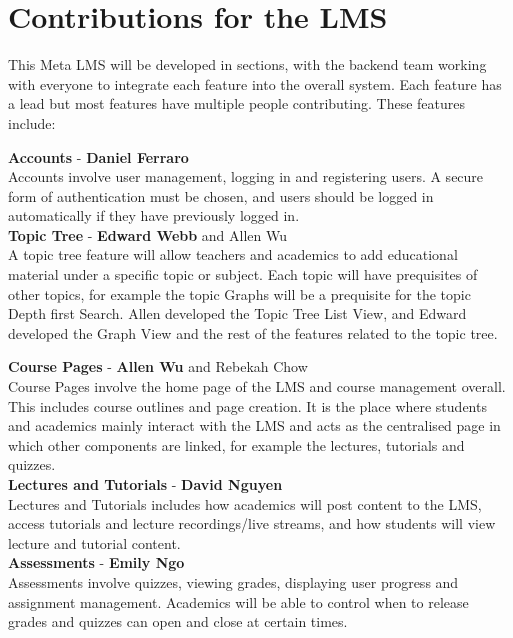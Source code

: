 \section{Contributions for the LMS}
This Meta LMS will be developed in sections, with the backend team working with everyone to integrate each feature into the overall system. Each feature has a lead but most features have multiple people contributing. These features include:

\textbf{Accounts} - \textbf{Daniel Ferraro} \\
Accounts involve user management, logging in and registering users. A secure form of authentication must be chosen, and users should be logged in automatically if they have previously logged in. \\

\textbf{Topic Tree} - \textbf{Edward Webb} and Allen Wu \\
A topic tree feature will allow teachers and academics to add educational material under a specific topic or subject. Each topic will have prequisites of other topics, for example the topic Graphs will be a prequisite for the topic Depth first Search. Allen developed the Topic Tree List View, and Edward developed the Graph View and the rest of the features related to the topic tree.

\textbf{Course Pages} - \textbf{Allen Wu} and Rebekah Chow \\
Course Pages involve the home page of the LMS and course management overall. This includes course outlines and page creation. It is the place where students and academics mainly interact with the LMS and acts as the centralised page in which other components are linked, for example the lectures, tutorials and quizzes. \\

\textbf{Lectures and Tutorials} - \textbf{David Nguyen} \\
Lectures and Tutorials includes how academics will post content to the LMS, access tutorials and lecture recordings/live streams, and how students will view lecture and tutorial content.\\

\textbf{Assessments} - \textbf{Emily Ngo} \\
Assessments involve quizzes, viewing grades, displaying user progress and assignment management. Academics will be able to control when to release grades and quizzes can open and close at certain times. \\

